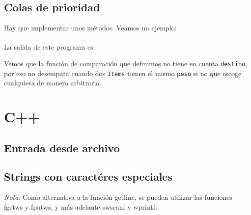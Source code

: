 \documentclass[10pt,letterpaper,twocolumn,twosided]{article}
\newcommand{\codigofuente}[1]{

\dotfill
}
\begin{document}
\subsection{Colas de prioridad}
\label{colas_de_prioridad_java}
Hay que implementar unos métodos. Veamos un ejemplo: \\
\codigofuente{./src/java/priority_queue.java}\\
La salida de este programa es: \\

\ttfamily
{}
 \normalfont\normalsize

Vemos que la función de comparación que definimos no tiene en cuenta \texttt{destino},
por eso no desempata cuando dos \texttt{Items} tienen el mismo \texttt{peso} si no que escoge
cualquiera de manera arbitraria.

\section{C++}
\subsection{Entrada desde archivo}
\codigofuente{./src/c++/io_file.cpp}

\subsection{Strings con caractéres especiales}
\codigofuente{./src/c++/unicode.cpp}

\emph{Nota}: Como alternativa a la función getline, se pueden utilizar las funciones fgetws y fputws, y más adelante swscanf y wprintf:
\codigofuente{./src/c++/fgetws.cpp}
\end{document}
